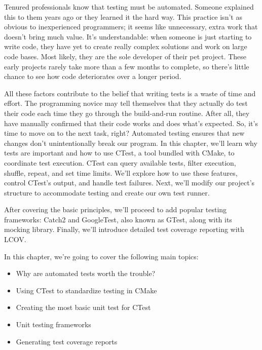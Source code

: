 Tenured professionals know that testing must be automated. Someone explained this to them years ago or they learned it the hard way. This practice isn’t as obvious to inexperienced programmers; it seems like unnecessary, extra work that doesn’t bring much value. It’s understandable: when someone is just starting to write code, they have yet to create really complex solutions and work on large code bases. Most likely, they are the sole developer of their pet project. These early projects rarely take more than a few months to complete, so there’s little chance to see how code deteriorates over a longer period.

All these factors contribute to the belief that writing tests is a waste of time and effort. The programming novice may tell themselves that they actually do test their code each time they go through the build-and-run routine. After all, they have manually confirmed that their code works and does what’s expected. So, it’s time to move on to the next task, right? Automated testing ensures that new changes don’t unintentionally break our program. In this chapter, we’ll learn why tests are important and how to use CTest, a tool bundled with CMake, to coordinate test execution. CTest can query available tests, filter execution, shuffle, repeat, and set time limits. We’ll explore how to use these features, control CTest’s output, and handle test failures.
Next, we’ll modify our project’s structure to accommodate testing and create our own test runner.

After covering the basic principles, we’ll proceed to add popular testing frameworks: Catch2 and GoogleTest, also known as GTest, along with its mocking library. Finally, we’ll introduce detailed test coverage reporting with LCOV.

In this chapter, we’re going to cover the following main topics:

\begin{itemize}
\item
Why are automated tests worth the trouble?

\item
Using CTest to standardize testing in CMake

\item
Creating the most basic unit test for CTest

\item
Unit testing frameworks

\item
Generating test coverage reports
\end{itemize}




















